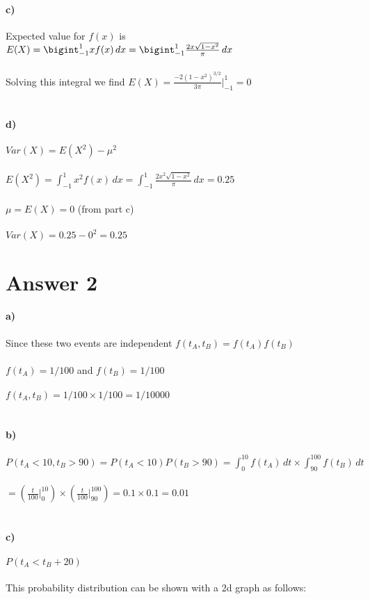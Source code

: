 \documentclass[12pt]{article}
\begin{document}
\paragraph{c)}
Expected value for $f(x)$ is $E(X) = \bigint_{-1}^{1} xf(x) \,dx = \bigint_{-1}^{1} \frac{2x\sqrt{1-x^2}}{\pi} \,dx$\\\\
Solving this integral we find $E(X) = \frac{-2 (1 - x^2)^{3/2}}{3 \pi} \vert_{-1}^{1} = 0$\\\\
\paragraph{d)}
$Var(X) = E(X^2) - \mu ^2$\\\\
$E(X^2) = \int_{-1}^{1} x^2 f(x) \,dx = \int_{-1}^{1} \frac{2x^2\sqrt{1-x^2}}{\pi} \,dx = 0.25$\\\\
$\mu = E(X) = 0$ (from part c)\\\\
$Var(X) = 0.25 - 0^2 = 0.25$
\newpage
\section*{Answer 2}
\paragraph{a)}
Since these two events are independent $f(t_A, t_B) = f(t_A)f(t_B)$\\\\
$f(t_A) = 1/100$ and $f(t_B) = 1/100$\\\\
$f(t_A, t_B) = 1/100 \times 1/100 = 1/10000$\\\\
\paragraph{b)}
$P(t_A < 10, t_B > 90) = P(t_A < 10)P(t_B > 90) = \int_0^{10}f(t_A)\,dt \times \int_{90}^{100}f(t_B) \,dt$\\\\
$=(\frac{t}{100}\vert_0^{10})\times(\frac{t}{100}\vert_{90}^{100}) = 0.1 \times 0.1 = 0.01$\\\\
\paragraph{c)}
$P(t_A < t_B + 20)$\\\\
This probability distribution can be shown with a 2d graph as follows:\\\\
\end{document}
